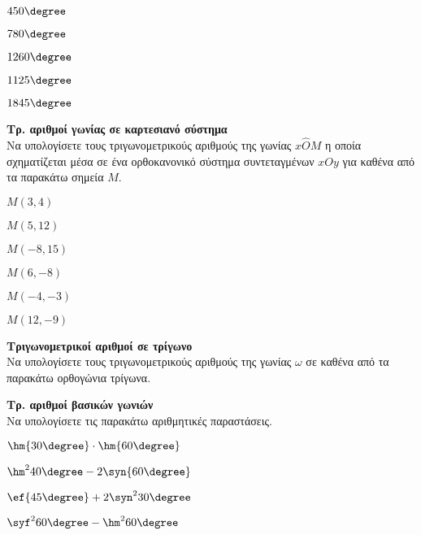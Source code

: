 \begin{multicols}{2}
\begin{multicols}{3}
\begin{rlist}
\item $ 450\degree $
\item $ 780\degree $
\item $ 1260\degree $
\item $ 1125\degree $
\item $ 1845\degree $
\end{rlist}
\end{multicols}
\Askhsh \textbf{Τρ. αριθμοί γωνίας σε καρτεσιανό σύστημα}\\
Να υπολογίσετε τους τριγωνομετρικούς αριθμούς της γωνίας $ x\hat{O}M $ η οποία σχηματίζεται μέσα σε ένα ορθοκανονικό σύστημα συντεταγμένων $ xOy $ για καθένα από τα παρακάτω σημεία $ M $.
\begin{multicols}{2}
\begin{rlist}[leftmargin=4mm]
\item $ M(3,4) $
\item $ M(5,12) $
\item $ M(-8,15) $
\item $ M(6,-8) $
\item $ M(-4,-3) $
\item $ M(12,-9) $
\end{rlist}
\end{multicols}
\Askhsh \textbf{Τριγωνομετρικοί αριθμοί σε τρίγωνο}\\
Να υπολογίσετε τους τριγωνομετρικούς αριθμούς της γωνίας $ \omega $ σε καθένα από τα παρακάτω ορθογώνια τρίγωνα.

\Askhsh \textbf{Τρ. αριθμοί βασικών γωνιών}\\
Να υπολογίσετε τις παρακάτω αριθμητικές παραστάσεις.
\begin{multicols}{2}
\begin{rlist}[leftmargin=4mm]
\item $ \hm{30\degree}\cdot\hm{60\degree} $
\item $ \hm^2{40\degree}-2\syn{60\degree} $
\item $ \ef{45\degree}+2\syn^2{30\degree} $
\item $ \syf^2{60\degree}-\hm^2{60\degree} $
\end{rlist}
\end{multicols}
\end{multicols}
